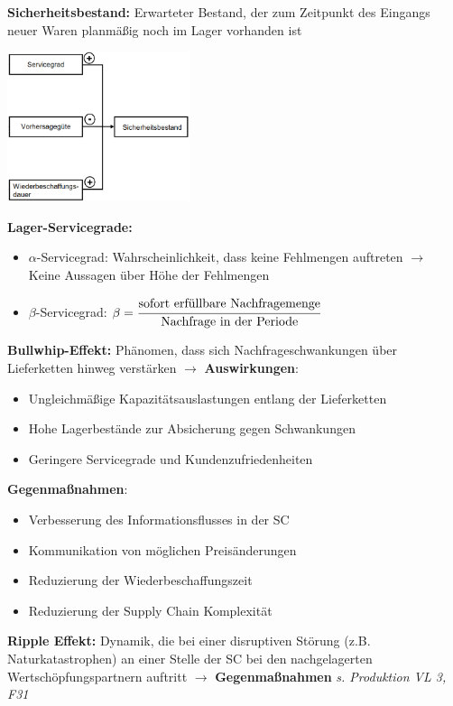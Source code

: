 \textbf{Sicherheitsbestand:} Erwarteter Bestand, der zum Zeitpunkt des Eingangs neuer Waren planmäßig noch im Lager vorhanden ist
\begin{center}
	\includegraphics[width=0.4\textwidth]{images/sicherheitsbestand.png}
\end{center}

\textbf{Lager-Servicegrade:}
\begin{itemize}
	\item $\alpha$-Servicegrad: Wahrscheinlichkeit, dass keine Fehlmengen auftreten $\rightarrow$ Keine Aussagen über Höhe der Fehlmengen
	\item $\beta$-Servicegrad: $\beta=\cfrac{\text{sofort erfüllbare Nachfragemenge}}{\text{Nachfrage in der Periode}}$
\end{itemize}
\bigskip
\textbf{Bullwhip-Effekt:} Phänomen, dass sich Nachfrageschwankungen über Lieferketten hinweg verstärken $\rightarrow$ \textbf{Auswirkungen}:
\begin{itemize}
	\item Ungleichmäßige Kapazitätsauslastungen entlang der Lieferketten
	\item Hohe Lagerbestände zur Absicherung gegen Schwankungen
	\item Geringere Servicegrade und Kundenzufriedenheiten
\end{itemize}

\textbf{Gegenmaßnahmen}:
\begin{itemize}
	\item Verbesserung des Informationsflusses in der SC
	\item Kommunikation von möglichen Preisänderungen
	\item Reduzierung der Wiederbeschaffungszeit
	\item Reduzierung der Supply Chain Komplexität
\end{itemize}
\bigskip
\textbf{Ripple Effekt:} Dynamik, die bei einer disruptiven Störung (z.B. Naturkatastrophen) an einer Stelle der SC bei den nachgelagerten Wertschöpfungspartnern auftritt $\rightarrow$ \textbf{Gegenmaßnahmen} \textit{s. Produktion VL 3, F31}

